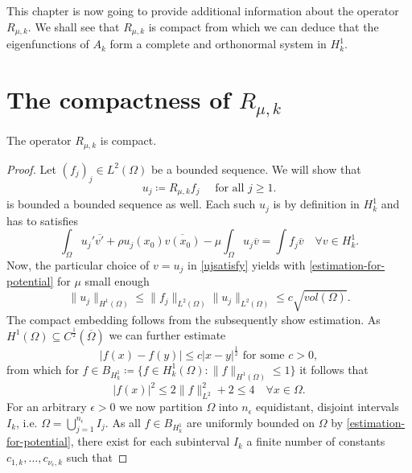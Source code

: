 This chapter is now going to provide additional information about the operator $R_{\mu, k}$. We shall see that $R_{\mu, k}$ is compact from which we can deduce that the eigenfunctions of $A_{k}$ form a complete and orthonormal system in $H^{1}_{k}$. %

\section{The compactness of  $R_{\mu, k}$} %
\begin{theorem} \label{3.1:thm-Rmuk.isCompact}
	The operator $R_{\mu, k}$ is compact.

	\begin{proof}
	Let $(f_{j})_{j} \in L^{2}(\Omega)$ be a  bounded sequence. We will show that 
		\[ u_{j} \coloneqq R_{\mu, k} f_{j} \quad \text{ for all } j \geq 1. \]
	is bounded a bounded sequence as well. Each such $u_{j}$ is by definition in $H^{1}_{k}$ and has to satisfies 
		\begin{equation}
			\int_{\Omega} u_{j}' \overline{v'} + \rho u_{j}(x_{0}) \overline{v(x_{0})} - \mu \int_{\Omega} u_{j} \overline{v} = \int f_{j} \overline{v} \quad \forall v \in H^{1}_{k}. \label{ujsatisfy}
		\end{equation} 
	Now, the particular choice of $v = u_{j}$ in \eqref{ujsatisfy} yields with \eqref{estimation-for-potential} for $\mu$ small enough
		\[  \| u_{j} \|_{H^{1}(\Omega)} \leq \| f_{j} \|_{L^{2}(\Omega)} \| u_{j} \|_{L^{2}(\Omega)} \leq c \sqrt{vol(\Omega)}. \]
	The compact embedding follows from the subsequently show estimation. As $H^1(\Omega) \subseteq C^{\frac{1}{2}}(\overline{\Omega})$ we can further estimate 
		\begin{equation}
			|f(x) - f(y)| \leq c |x - y|^{\frac{1}{2}} \text{ for some } c > 0, \label{eq:H1estimation}
		\end{equation}
	from which for $f \in B_{H^{1}_{k}} \coloneqq \{ f \in H^{1}_{k}(\Omega) : \| f \|_{H^{1}(\Omega)} \leq 1 \}$ it follows that 
		\[ |f(x)|^{2} \leq 2 \| f \|_{L^{2}}^{2} + 2 \leq 4 \quad \forall x \in \Omega. \]
	For an arbitrary $\epsilon > 0$ we now partition $\Omega$ into $n_{\epsilon}$ equidistant, disjoint intervals $I_{k}$, i.e. $\Omega = \bigcup_{j = 1}^{n_{\epsilon}} I_{j}$. As all $f \in B_{H^{1}_{k}}$ are uniformly bounded on $\Omega$ by \eqref{estimation-for-potential}, there exist for each subinterval $I_{k}$ a finite number of constants $c_{1, k}, \dotsc, c_{\nu_{\epsilon}, k}$ such that 

\end{proof}
\end{theorem}
